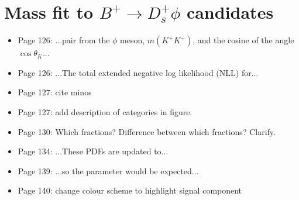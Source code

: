 \documentclass[12pt]{article}
\begin{document}
\section{Mass fit to $B^+ \rightarrow D_s^+ \phi$ candidates}

\begin{itemize}


\item Page 126: ...pair {\color{red}from} the $\phi$ meson, $m(K^+K^-)$, and the cosine of {\color{red}the} angle $\cos\theta_{K}$...
\item Page 126: ...The total extended {\color{red}negative log likelihood} (NLL) for...
\item Page 127: {\color{blue} cite minos}
\item Page 127: {\color{blue} add description of categories in figure.}
\item Page 130: {\color{blue} Which fractions? Difference between which fractions? Clarify.}
\item Page 134: ...These PDFs are {\color{red}updated} to...
\item Page 139: ...so the {\color{red}parameter} would be expected...
\item Page 140: {\color{blue} change colour scheme to highlight signal component}
\end{itemize}
\end{document}
